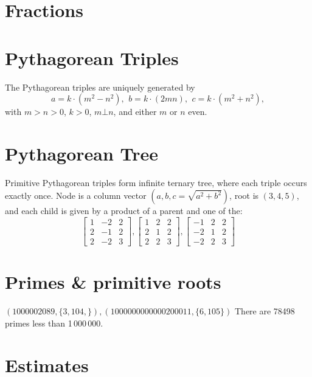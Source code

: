\section{Fractions}

\section{Pythagorean Triples}
 The Pythagorean triples are uniquely generated by
 \[ a=k\cdot (m^{2}-n^{2}),\ \,b=k\cdot (2mn),\ \,c=k\cdot (m^{2}+n^{2}), \]
 with $m > n > 0$, $k > 0$, $m \bot n$, and either $m$ or $n$ even.

\section{Pythagorean Tree}
Primitive Pythagorean triples form infinite ternary tree, where each triple occurs exactly once.
Node is a column vector $(a, b, c = \sqrt{a^2+b^2})$, root is $(3, 4, 5)$, and each child is given by a product of a parent and one of the:
$$
\begin{bmatrix}
	1 & -2 & 2\\
	2 & -1 & 2\\
	2 & -2 & 3
\end{bmatrix},
\begin{bmatrix}
	1 & 2 & 2\\
	2 & 1 & 2\\
	2 & 2 & 3
\end{bmatrix},
\begin{bmatrix}
	-1 & 2 & 2\\
	-2 & 1 & 2\\
	-2 & 2 & 3
\end{bmatrix}
$$


\section{Primes \& primitive roots}
	$(1000002089, \{3, 104, \}), (1000000000000200011, \{6, 105\})$
	There are 78498 primes less than 1\,000\,000.


\section{Estimates}

